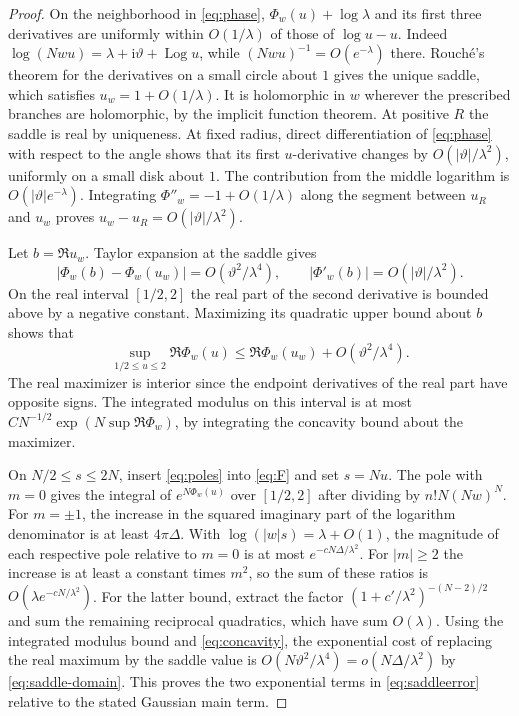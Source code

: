 \documentclass[11pt]{article}
\newcommand{\ii}{\mathrm i}
\newcommand{\Log}{\operatorname{Log}}
\begin{document}
\begin{proof}
On the neighborhood in \eqref{eq:phase}, \(\Phi_w(u)+\log\lambda\) and its first three derivatives are uniformly within \(O(1/\lambda)\) of those of \(\log u-u\). Indeed \(\log(Nwu)=\lambda+\ii\vartheta+\Log u\), while \((Nwu)^{-1}=O(e^{-\lambda})\) there. Rouch\'e's theorem for the derivatives on a small circle about \(1\) gives the unique saddle, which satisfies \(u_w=1+O(1/\lambda)\). It is holomorphic in \(w\) wherever the prescribed branches are holomorphic, by the implicit function theorem. At positive \(R\) the saddle is real by uniqueness. At fixed radius, direct differentiation of \eqref{eq:phase} with respect to the angle shows that its first \(u\)-derivative changes by \(O(|\vartheta|/\lambda^2)\), uniformly on a small disk about \(1\). The contribution from the middle logarithm is \(O(|\vartheta|e^{-\lambda})\). Integrating \(\Phi''_w=-1+O(1/\lambda)\) along the segment between \(u_R\) and \(u_w\) proves \(u_w-u_R=O(|\vartheta|/\lambda^2)\).

Let \(b=\Re u_w\). Taylor expansion at the saddle gives
\[
 |\Phi_w(b)-\Phi_w(u_w)|=O(\vartheta^2/\lambda^4),\qquad
 |\Phi'_w(b)|=O(|\vartheta|/\lambda^2).
\]
On the real interval \([1/2,2]\) the real part of the second derivative is bounded above by a negative constant. Maximizing its quadratic upper bound about \(b\) shows that
\begin{equation}\label{eq:concavity}
 \sup_{1/2\le u\le 2}\Re\Phi_w(u)
   \le \Re\Phi_w(u_w)+O(\vartheta^2/\lambda^4).
\end{equation}
The real maximizer is interior since the endpoint derivatives of the real part have opposite signs. The integrated modulus on this interval is at most \(C N^{-1/2}\exp(N\sup\Re\Phi_w)\), by integrating the concavity bound about the maximizer.

On \(N/2\le s\le2N\), insert \eqref{eq:poles} into \eqref{eq:F} and set \(s=Nu\). The pole with \(m=0\) gives the integral of \(e^{N\Phi_w(u)}\) over \([1/2,2]\) after dividing by \(n!N(Nw)^N\). For \(m=\pm1\), the increase in the squared imaginary part of the logarithm denominator is at least \(4\pi\Delta\). With \(\log(|w|s)=\lambda+O(1)\), the magnitude of each respective pole relative to \(m=0\) is at most \(e^{-cN\Delta/\lambda^2}\). For \(|m|\ge2\) the increase is at least a constant times \(m^2\), so the sum of these ratios is \(O(\lambda e^{-cN/\lambda^2})\). For the latter bound, extract the factor \((1+c'/\lambda^2)^{-(N-2)/2}\) and sum the remaining reciprocal quadratics, which have sum \(O(\lambda)\). Using the integrated modulus bound and \eqref{eq:concavity}, the exponential cost of replacing the real maximum by the saddle value is \(O(N\vartheta^2/\lambda^4)=o(N\Delta/\lambda^2)\) by \eqref{eq:saddle-domain}. This proves the two exponential terms in \eqref{eq:saddleerror} relative to the stated Gaussian main term.


\end{proof}
\end{document}
